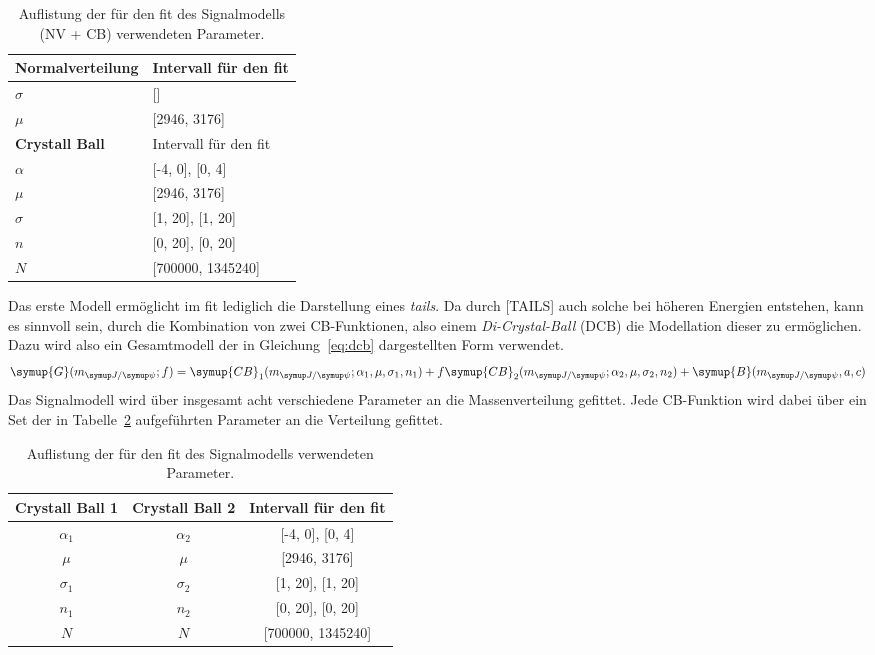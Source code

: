 %
\begin{table}[H]
  \centering
  \caption{Auflistung der für den fit des Signalmodells (NV + CB) verwendeten Parameter.}
  \begin{tabular}{ll}
    \toprule
    \textbf{Normalverteilung}   & Intervall für den fit \\
    \midrule
    \quad$\sigma$               & []  \\
    \quad$\mu$                  & [2946, 3176]  \\
    \midrule
    \textbf{Crystall Ball}      &  Intervall für den fit \\
    \midrule
    \quad$\alpha$               & [-4, 0], [0, 4] \\
    \quad$\mu$                  & [2946, 3176] \\
    \quad$\sigma$               & [1, 20], [1, 20] \\
    \quad$n$                    & [0, 20], [0, 20] \\
    \quad$N$                    & [700000, 1345240] \\
    \bottomrule
  \end{tabular}
  \label{tab:params1}
\end{table}
%
Das erste Modell ermöglicht im fit lediglich die Darstellung eines \textit{tails}. Da durch [TAILS] auch solche bei höheren Energien entstehen, kann es sinnvoll sein, durch die Kombination von zwei CB-Funktionen, also einem \textit{Di-Crystal-Ball} (DCB) die Modellation dieser zu ermöglichen. Dazu wird also ein Gesamtmodell der in Gleichung~\ref{eq:dcb} dargestellten Form verwendet.
%
\begin{equation}
  \symup{G}(m_{\jpsi}; f)=\symup{CB}_1(m_{\jpsi};\alpha_1,\mu,\sigma_1,n_1) + f\symup{CB}_2(m_{\jpsi};\alpha_2,\mu,\sigma_2,n_2) + \symup{B}(m_{\jpsi},a,c)
  \label{eq:dcb}
\end{equation}
%
Das Signalmodell wird über insgesamt acht verschiedene Parameter an die Massenverteilung gefittet. Jede CB-Funktion wird dabei über ein Set der in Tabelle~\ref{tab:params} aufgeführten Parameter an die Verteilung gefittet.
%
\begin{table}[H]
  \centering
  \caption{Auflistung der für den fit des Signalmodells verwendeten Parameter.}
  \begin{tabular}{ccc}
    \toprule
    \textbf{Crystall Ball 1}    & \textbf{Crystall Ball 2} & Intervall für den fit \\
    \midrule
    $\alpha_1$                  & $\alpha_2$               & [-4, 0], [0, 4] \\
    $\mu$                       & $\mu$                    & [2946, 3176] \\
    $\sigma_1$                  & $\sigma_2$               & [1, 20], [1, 20] \\
    $n_1$                       & $n_2$                    & [0, 20], [0, 20] \\
    $N$                         & $N$                      & [700000, 1345240] \\
    \bottomrule
  \end{tabular}
  \label{tab:params}
\end{table}

